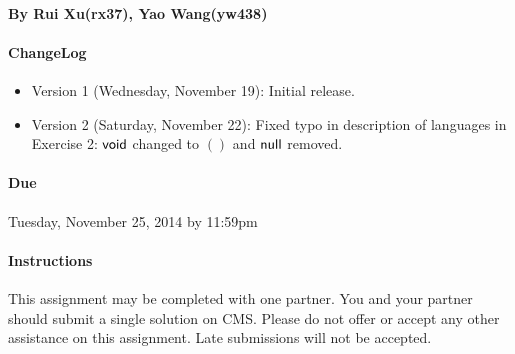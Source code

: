 \documentclass[10pt]{article}
\begin{document}

\paragraph{By Rui Xu(rx37), Yao Wang(yw438)}
\paragraph{ChangeLog}
\begin{itemize}
\item Version 1 (Wednesday, November 19): Initial release.
\item Version 2 (Saturday, November 22): Fixed typo in description of languages in Exercise 2: $\mathsf{void}$ changed to $()$ and $\mathsf{null}$ removed.
\end{itemize}


\paragraph{Due} Tuesday, November 25, 2014 by 11:59pm 

\paragraph{Instructions} 
This assignment may be completed with one partner.  You and your
partner should submit a single solution on CMS. Please do not offer or
accept any other assistance on this assignment. Late submissions will
not be accepted.
\end{document}
